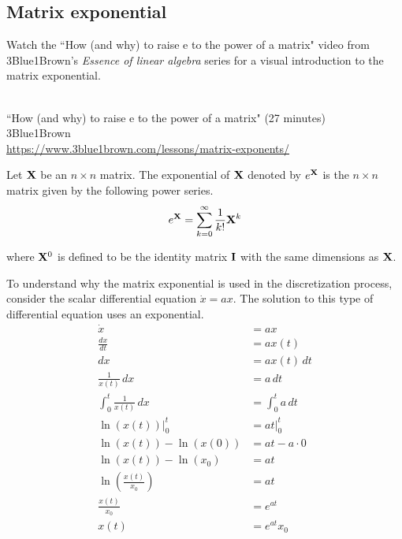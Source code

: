 \subsection{Matrix exponential}
\begin{remark}
  Watch the ``How (and why) to raise e to the power of a matrix" video from
  3Blue1Brown's \textit{Essence of linear algebra} series for a visual
  introduction to the matrix exponential.
  \begin{bookfigure}
     \\
    ``How (and why) to raise e to the power of a matrix" (27 minutes) \\
    \footnotesize 3Blue1Brown \\
    \url{https://www.3blue1brown.com/lessons/matrix-exponents/}
  \end{bookfigure}
\end{remark}
\begin{definition}
  Let $\mathbf{X}$ be an $n \times n$ matrix. The exponential of $\mathbf{X}$ denoted
  by $e^{\mathbf{X}}$ is the $n \times n$ matrix given by the following power
  series.
  \begin{equation}
    e^{\mathbf{X}} = \sum_{k=0}^\infty \frac{1}{k!} \mathbf{X}^k \label{eq:mat_exp}
  \end{equation}

  where $\mathbf{X}^0$ is defined to be the identity matrix $\mathbf{I}$ with the same
  dimensions as $\mathbf{X}$.
\end{definition}

To understand why the matrix exponential is used in the \gls{discretization}
process, consider the scalar differential equation $\dot{x} = ax$. The solution
to this type of differential equation uses an exponential.
\begin{align*}
  \dot{x} &= ax \\
  \frac{dx}{dt} &= ax(t) \\
  dx &= ax(t) \,dt \\
  \frac{1}{x(t)} \,dx &= a \,dt \\
  \int_0^t \frac{1}{x(t)} \,dx &= \int_0^t a \,dt \\
  \ln(x(t)) \rvert_0^t &= at \rvert_0^t \\
  \ln(x(t)) - \ln(x(0)) &= at - a \cdot 0 \\
  \ln(x(t)) - \ln(x_0) &= at \\
  \ln\left(\frac{x(t)}{x_0}\right) &= at \\
  \frac{x(t)}{x_0} &= e^{at} \\
  x(t) &= e^{at} x_0
\end{align*}


